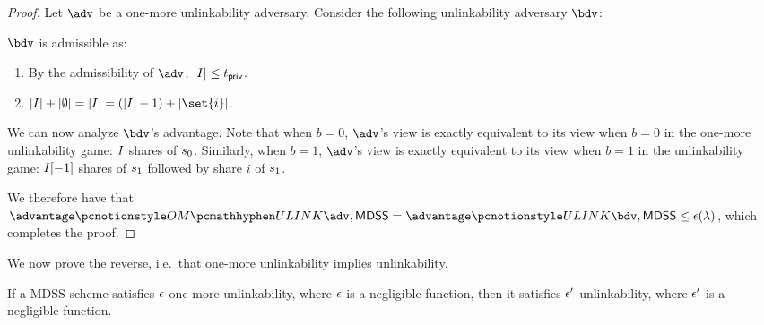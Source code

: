 \begin{proof}
	Let $\adv$ be a one-more unlinkability adversary.
	Consider the following unlinkability adversary $\bdv$:
	\begin{pcvstack}[center, space=1em]

	\end{pcvstack}

	$\bdv$ is admissible as:
	\begin{enumerate}
		\item By the admissibility of $\adv$, $|I| \leq t_{\mathsf{priv}}$.
		\item $|\indexSet| + |\emptyset| = \left|\indexSet\right| = (|\indexSet| - 1) + |\set{i}|$.
	\end{enumerate}

	We can now analyze $\bdv$'s advantage.
	Note that when $b = 0$, $\adv$'s view is exactly equivalent to its view when $b = 0$ in the one-more unlinkability game: $I$ shares of $s_0$.
	Similarly, when $b = 1$, $\adv$'s view is exactly equivalent to its view when $b = 1$ in the unlinkability game: $I[-1]$ shares of $s_1$ followed by share $i$ of $s_1$.

	We therefore have that $\mdssOMUAdv = \mdssUBdv \leq \mdssULVar(\secpar)$, which completes the proof.
\end{proof}


We now prove the reverse, i.e.\ that one-more unlinkability implies unlinkability.
\begin{theorem}
	\label{thm:omul-implies-ul}
	If a MDSS scheme satisfies $\epsilon$-one-more unlinkability, where $\epsilon$ is a negligible function, then it satisfies $\epsilon'$-unlinkability, where $\epsilon'$ is a negligible function.
\end{theorem}

